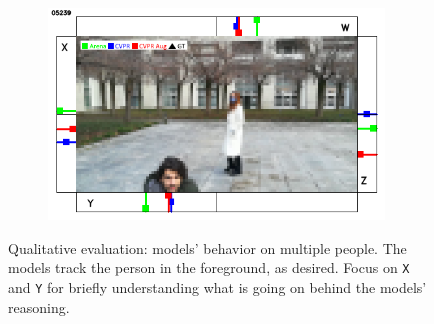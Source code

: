 \begin{figure}[H]
\begin{center}
\begin{subfigure}[h]{0.49\textwidth}
		\end{subfigure}
		\hfill
		\begin{subfigure}[h]{0.49\textwidth}
			\centering
			\includegraphics[width=0.98\textwidth]{"contents/images/qualitative-videos/double4-square02-5239"}
		\end{subfigure}
	\end{center}
	\vspace{-0.5cm}
	\caption[Qualitative evaluation: models' behavior on multiple people]{Qualitative evaluation: models' behavior on multiple people. The models track the person in the foreground, as desired. Focus on \texttt{X} and \texttt{Y} for briefly understanding what is going on behind the models' reasoning.}
	\label{fig:ql-sim-double-foreground}
\end{figure}

